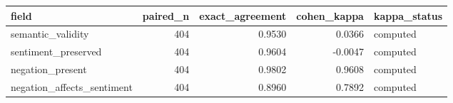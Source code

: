 \begin{tabular}{lrrrl}
\toprule
field & paired_n & exact_agreement & cohen_kappa & kappa_status \\
\midrule
semantic_validity & 404 & 0.9530 & 0.0366 & computed \\
sentiment_preserved & 404 & 0.9604 & -0.0047 & computed \\
negation_present & 404 & 0.9802 & 0.9608 & computed \\
negation_affects_sentiment & 404 & 0.8960 & 0.7892 & computed \\
\bottomrule
\end{tabular}

